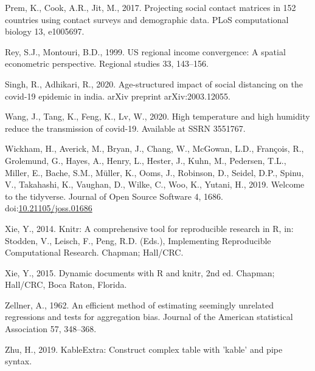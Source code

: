 \documentclass[]{elsarticle} %
\begin{document}
\leavevmode\hypertarget{ref-prem2017projecting}{}%
Prem, K., Cook, A.R., Jit, M., 2017. Projecting social contact matrices
in 152 countries using contact surveys and demographic data. PLoS
computational biology 13, e1005697.

\leavevmode\hypertarget{ref-Rey1999us}{}%
Rey, S.J., Montouri, B.D., 1999. US regional income convergence: A
spatial econometric perspective. Regional studies 33, 143--156.

\leavevmode\hypertarget{ref-singh2020age}{}%
Singh, R., Adhikari, R., 2020. Age-structured impact of social
distancing on the covid-19 epidemic in india. arXiv preprint
arXiv:2003.12055.

\leavevmode\hypertarget{ref-wang2020high}{}%
Wang, J., Tang, K., Feng, K., Lv, W., 2020. High temperature and high
humidity reduce the transmission of covid-19. Available at SSRN 3551767.

\leavevmode\hypertarget{ref-Wickham2019}{}%
Wickham, H., Averick, M., Bryan, J., Chang, W., McGowan, L.D., François,
R., Grolemund, G., Hayes, A., Henry, L., Hester, J., Kuhn, M., Pedersen,
T.L., Miller, E., Bache, S.M., Müller, K., Ooms, J., Robinson, D.,
Seidel, D.P., Spinu, V., Takahashi, K., Vaughan, D., Wilke, C., Woo, K.,
Yutani, H., 2019. Welcome to the tidyverse. Journal of Open Source
Software 4, 1686.
doi:\href{https://doi.org/10.21105/joss.01686}{10.21105/joss.01686}

\leavevmode\hypertarget{ref-Xie2014}{}%
Xie, Y., 2014. Knitr: A comprehensive tool for reproducible research in
R, in: Stodden, V., Leisch, F., Peng, R.D. (Eds.), Implementing
Reproducible Computational Research. Chapman; Hall/CRC.

\leavevmode\hypertarget{ref-Xie2015}{}%
Xie, Y., 2015. Dynamic documents with R and knitr, 2nd ed. Chapman;
Hall/CRC, Boca Raton, Florida.

\leavevmode\hypertarget{ref-Zellner1962efficient}{}%
Zellner, A., 1962. An efficient method of estimating seemingly unrelated
regressions and tests for aggregation bias. Journal of the American
statistical Association 57, 348--368.

\leavevmode\hypertarget{ref-Zhu2019}{}%
Zhu, H., 2019. KableExtra: Construct complex table with 'kable' and pipe
syntax.
\end{document}
